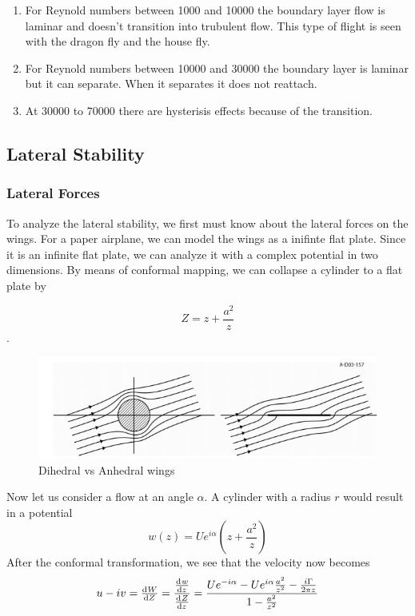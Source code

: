 \begin{enumerate}
\item For Reynold numbers between 1000 and 10000 the boundary layer flow is laminar
and doesn't transition into trubulent flow. This type of flight is seen with
the dragon fly and the house fly. 
\item  For Reynold numbers between 10000 and 30000 the boundary layer is laminar but
it can separate. When it separates it does not reattach.
\item At 30000 to 70000 there are hysterisis effects because of the transition. 

\end{enumerate}

\subsection{Lateral Stability}

\subsubsection{Lateral Forces}

To analyze the lateral stability, we first must know about the lateral forces on the wings.
For a paper airplane, we can model the wings as a inifinte flat plate. Since it is
an infinite flat plate, we can analyze it with a complex potential in two dimensions.
By means of conformal mapping, we can collapse a cylinder to a flat plate by

\[Z = z + \frac{a^2}{z}\].

\begin{figure}[hl]
  \centering
    \includegraphics[scale=.5]{figures/flatplate1.png}
    \caption{Dihedral vs Anhedral wings}
  \label{fig:dihedraleffect}
\end{figure}

Now let us consider a flow at an angle $\alpha$. A cylinder with a radius $r$
would result in a potential
\[w(z) = Ue^{i\alpha}(z + \frac{a^2}{z}) \]
After the conformal transformation, we see that the velocity now becomes
\[u - iv = \od{W}{Z} = \frac{\od{w}{z}}{\od{Z}{z}} = \frac{Ue^{-i\alpha}-Ue^{i\alpha}\frac{a^2}{z^2}
- \frac{i \Gamma}{2\pi z}}{1 - \frac{a^2}{z^2}}\]

